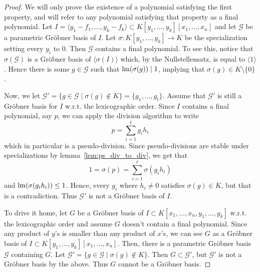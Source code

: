 \indent \begin{proof}
  We will only prove the existence of a polynomial satisfying the first property, and will refer to any polynomial satisfying that property as a final polynomial. Let $I = \langle y_{1} - f_{1}, \dots, y_{k} - f_{k} \rangle \subset K[y_{1}, \dots, y_{k}][x_{1}, \dots, x_{n}]$ and let $\mathcal G$ be a parametric Gröbner basis of $I$. Let $\sigma : K[y_{1}, \dots, y_{k}] \to K$ be the specialization setting every $y_{i}$ to 0. Then $\mathcal G$ contains a final polynomial. To see this, notice that $\sigma(\mathcal G)$ is a Gröbner basis of $\langle \sigma(I) \rangle$ which, by the Nullstellensatz, is equal to $\langle 1 \rangle$. Hence there is some $g \in \mathcal G$ such that $\operatorname{lm}(\sigma(g)) \mid 1$, implying that $\sigma(g) \in K \setminus \{0\}$.

  Now, we let $\mathcal G' = \{g \in \mathcal G \mid \sigma(g) \notin K\} = \{g_{1}, \dots, g_{t}\}$. Assume that $\mathcal G'$ is still a Gröbner basis for $I$ w.r.t. the lexicographic order. Since $I$ contains a final polynomial, say $p$, we can apply the division algorithm to write
  \[p = \sum_{i=1}^{t} g_{i}h_{i}\]
  which in particular is a pseudo-division. Since pseudo-divisions are stable under specializations by lemma~\ref{lem:ps_div_to_div}, we get that
  \[1 = \sigma(p) = \sum_{i=1}^{t} \sigma(g_{i} h_{i})\]
  and $\operatorname{lm}(\sigma(g_{i}h_{i})) \leq 1$. Hence, every $g_{i}$ where $h_{i} \neq 0$ satisfies $\sigma(g) \in K$, but that is a contradiction. Thus $\mathcal G'$ is not a Gröbner basis of $I$.

  To drive it home, let $G$ be a Gröbner basis of $I \subset K[x_{1}, \dots, x_{n}, y_{1}, \dots, y_{k}]$ w.r.t. the lexicographic order and assume $G$ doesn't contain a final polynomial. Since any product of $y$'s is smaller than any product of $x$'s, we can see $G$ as a Gröbner basis of $I \subset K[y_{1}, \dots, y_{k}][x_{1}, \dots, x_{n}]$. Then, there is a parametric Gröbner basis $\mathcal G$ containing $G$. Let $\mathcal G' = \{g \in \mathcal G \mid \sigma(g) \notin K\}$. Then $G \subset \mathcal G'$, but $\mathcal G'$ is not a Gröbner basis by the above. Thus $G$ cannot be a Gröbner basis.
\end{proof}















